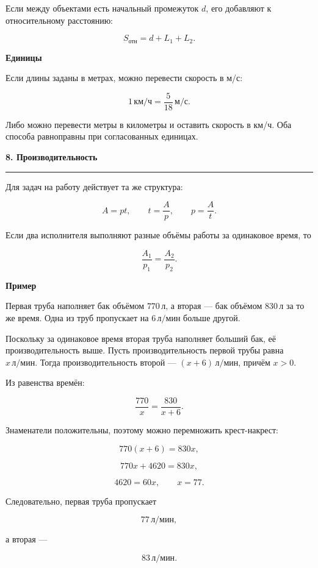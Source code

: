 \documentclass[a4paper,12pt]{article}
\newcommand{\sect}[1]{%
    \vspace{0.35em}%
    {\Large\bfseries\color{darkaccent}#1}\par
    \vspace{0.22em}%
    \color{linegray}\hrule
    \color{textgray}%
    \vspace{0.55em}%
}
\newcommand{\subsect}[1]{%
    \vspace{0.3em}%
    {\large\bfseries\color{accent}#1}\par
    \vspace{0.18em}%
}
\newcommand{\unit}[1]{\,\text{#1}}
\begin{document}
Если между объектами есть начальный промежуток $d$,
его добавляют к относительному расстоянию:

\[
S_{\text{отн}}=d+L_1+L_2.
\]

\subsect{Единицы}

Если длины заданы в метрах, можно перевести скорость в м/с:

\[
1\unit{км/ч}=\frac{5}{18}\unit{м/с}.
\]

Либо можно перевести метры в километры и оставить скорость в км/ч.
Оба способа равноправны при согласованных единицах.


\sect{8. Производительность}

Для задач на работу действует та же структура:

\[
A=pt,
\qquad
t=\frac{A}{p},
\qquad
p=\frac{A}{t}.
\]

Если два исполнителя выполняют разные объёмы работы за одинаковое время,
то

\[
\frac{A_1}{p_1}=\frac{A_2}{p_2}.
\]

\subsect{Пример}

Первая труба наполняет бак объёмом $770\unit{л}$,
а вторая --- бак объёмом $830\unit{л}$ за то же время.
Одна из труб пропускает на $6\unit{л/мин}$ больше другой.

Поскольку за одинаковое время вторая труба наполняет больший бак,
её производительность выше.
Пусть производительность первой трубы равна $x\unit{л/мин}$.
Тогда производительность второй --- $(x+6)\unit{л/мин}$, причём $x>0$.

Из равенства времён:

\[
\frac{770}{x}=\frac{830}{x+6}.
\]

Знаменатели положительны, поэтому можно перемножить крест-накрест:

\[
770(x+6)=830x,
\]

\[
770x+4620=830x,
\]

\[
4620=60x,
\qquad
x=77.
\]

Следовательно, первая труба пропускает

\[
77\unit{л/мин},
\]

а вторая ---

\[
83\unit{л/мин}.
\]

\end{document}
